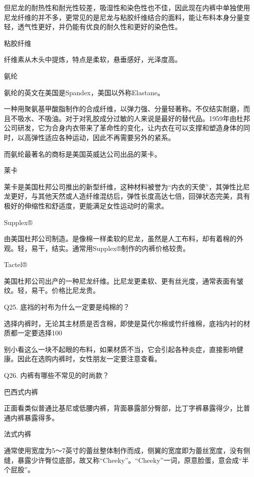 \documentclass[12pt,UTF8]{ctexbook}
\begin{document}
但尼龙的耐热性和耐光性较差，吸湿性和染色性也不佳，因此现在内裤中单独使用尼龙纤维的并不多，更常见的是尼龙与粘胶纤维结合的面料，能让布料本身分量变轻，透气性更好，并仍能有优良的耐久性和更好的染色性。

粘胶纤维

纤维素从木头中提炼，特点是柔软，悬垂感好，光泽度高。

氨纶

氨纶的英文在美国是Spandex，美国以外称Elastane。

一种用聚氨基甲酸脂制作的合成纤维，以弹力强、分量轻著称。不仅结实耐磨，而且不吸水、不吸油。对于对乳胶成分过敏的人来说是最好的替代品。1959年由杜邦公司研发，它为合身内衣带来了革命性的变化，让内衣在可以支撑和塑造身体的同时，以高弹性适应各种运动，因此不再需要另外的紧系。

而氨纶最著名的商标是美国英威达公司出品的莱卡。

莱卡

莱卡是美国杜邦公司推出的新型纤维，这种材料被誉为“内衣的天使”，其弹性比尼龙更好，与其他天然或人造纤维混纺后，弹性长度高达七倍，回弹状态完美，具有极好的伸缩性和舒适度，更能满足女性运动时的需求。

Supplex®

由美国杜邦公司制造。是像棉一样柔软的尼龙，虽然是人工布料，却有着棉的外观。轻，易干，结实。通常用Supplex®制作的内裤价格较贵。

Tactel®

美国杜邦公司出产的一种尼龙纤维。比尼龙更柔软、更有丝光度，通常表面有皱纹。轻，易干。价格比尼龙贵。





Q25. 底裆的衬布为什么一定要是纯棉的？


选择内裤时，无论其主材质是否含棉，即使是莫代尔棉或竹纤维棉，底裆内衬的材质都一定要选择100%

别小看这么一块不起眼的布料，如果材质不当，它会引起各种炎症，直接影响健康。因此在选购内裤时，女性朋友一定要注意查看。





Q26. 内裤有哪些不常见的时尚款？


巴西式内裤

正面看类似普通比基尼或低腰内裤，背面暴露部分臀部，比丁字裤暴露得少，比普通内裤暴露得多。

法式内裤

通常使用宽度为5～7英寸的蕾丝整体制作而成，侧翼的宽度即为蕾丝宽度，没有侧缝，暴露少许臀位底部，故又称“Cheeky”。“Cheeky”一词，原意脸蛋，意会成“半个屁股”。
\end{document}
